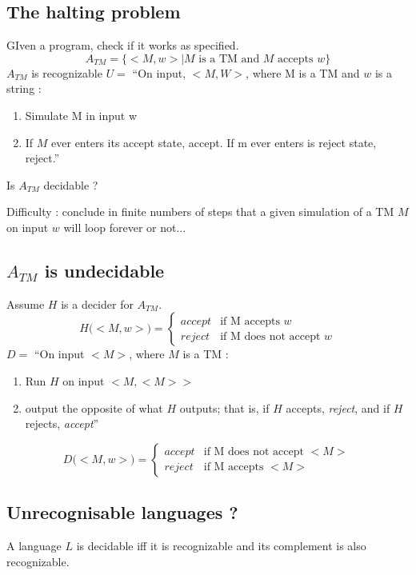 \documentclass[12pt,a4paper]{article}
\newcommand{\<}{\langle}
\renewcommand{\>}{\rangle}
\begin{document}
\subsection{The halting problem}
GIven a program, check if it works as specified.
\[A_{TM} = \Big\{\big< M, w\big> | M \text{ is a TM and } M \text{ accepts } w\big\}\]
$A_{TM}$ is recognizable
$U =$ ``On input, $<M,W>$, where M is a TM and $w$ is a string : 
\begin{enumerate}
    \item Simulate M in input w
    \item If $M$ ever enters its accept state, accept. If m ever enters is reject state, reject.''
\end{enumerate}
\begin{center}
    Is $A_{TM}$ decidable ?
\end{center}
Difficulty : conclude in finite numbers of steps that a given simulation of a TM $M$ on input $w$ will loop forever or not...

\subsection{$A_{TM}$ is undecidable}
Assume $H$ is a decider for $A_{TM}$.
\[H\big(<M,w>\big) = \left\{\begin{array}{ll}
    accept & \text{if M accepts } w\\
    reject & \text{if M does not accept } w
\end{array}\right.\]
$D =$ ``On input $<M>$, where $M$ is a TM :
\begin{enumerate}
    \item Run $H$ on input $\big<M, <M>\big>$
    \item output the opposite of what $H$ outputs; that is, if $H$ accepts, \textit{reject}, and if $H$ rejects, \textit{accept}''
\end{enumerate}
\[D\big(<M,w>\big) = \left\{\begin{array}{ll}
    accept & \text{if M does not accept } <M>\\
    reject & \text{if M accepts } <M>  
\end{array}\right.\]

\subsection{Unrecognisable languages ?}
\begin{boite}
     A language $L$ is decidable iff it is recognizable and its complement is also recognizable.
\end{boite}
\end{document}
